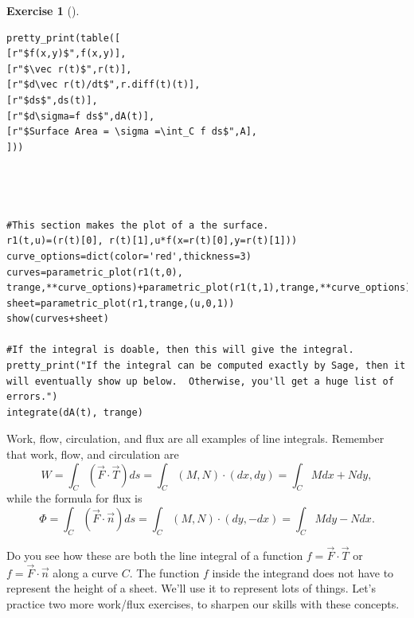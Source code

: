 \documentclass[10pt,]{book}
\theoremstyle{plain}
\theoremstyle{definition}
\theoremstyle{definition}
\theoremstyle{definition}
\theoremstyle{definition}
\newtheorem{exploration}[project]{Exercise}
\theoremstyle{definition}
\numberwithin{equation}{section}
\begin{document}
\begin{exploration}[]
\begin{lstlisting}[style=sageinput]
pretty_print(table([
[r"$f(x,y)$",f(x,y)],
[r"$\vec r(t)$",r(t)],
[r"$d\vec r(t)/dt$",r.diff(t)(t)],
[r"$ds$",ds(t)],
[r"$d\sigma=f ds$",dA(t)],
[r"$Surface Area = \sigma =\int_C f ds$",A],
]))




#This section makes the plot of a the surface.
r1(t,u)=(r(t)[0], r(t)[1],u*f(x=r(t)[0],y=r(t)[1]))
curve_options=dict(color='red',thickness=3)
curves=parametric_plot(r1(t,0), trange,**curve_options)+parametric_plot(r1(t,1),trange,**curve_options)
sheet=parametric_plot(r1,trange,(u,0,1))
show(curves+sheet)

#If the integral is doable, then this will give the integral. 
pretty_print("If the integral can be computed exactly by Sage, then it will eventually show up below.  Otherwise, you'll get a huge list of errors.")
integrate(dA(t), trange)
\end{lstlisting}
\end{exploration}
Work, flow, circulation, and flux are all examples of line integrals. Remember that work, flow, and circulation are%
\begin{equation*}
W=\int_C (\vec F\cdot \vec T)ds =\int_C (M,N)\cdot(dx,dy) =  \int_C Mdx+Ndy,
\end{equation*}
while the formula for flux is%
\begin{equation*}
\Phi=\int_C (\vec F\cdot \vec n)ds =\int_C (M,N)\cdot(dy,-dx) =  \int_C Mdy-Ndx.
\end{equation*}
%
\par
Do you see how these are both the line integral of a function \(f = \vec F\cdot \vec T\) or \(f=\vec F\cdot \vec n\) along a curve \(C\). The function \(f\) inside the integrand does not have to represent the height of a sheet. We'll use it to represent lots of things. Let's practice two more work/flux exercises, to sharpen our skills with these concepts.%
\end{document}
